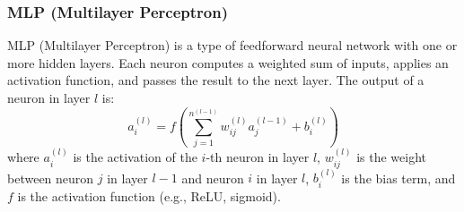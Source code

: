 \subsubsection{MLP (Multilayer Perceptron)}
MLP (Multilayer Perceptron) is a type of feedforward neural network with one or more hidden layers. Each neuron computes a weighted sum of inputs, applies an activation function, and passes the result to the next layer. The output of a neuron in layer $l$ is:
\begin{equation*}
a_i^{(l)} = f \left( \sum_{j=1}^{n^{(l-1)}} w_{ij}^{(l)} a_j^{(l-1)} + b_i^{(l)} \right)
\end{equation*}
where $a_i^{(l)}$ is the activation of the $i$-th neuron in layer $l$, $w_{ij}^{(l)}$ is the weight between neuron $j$ in layer $l-1$ and neuron $i$ in layer $l$, $b_i^{(l)}$ is the bias term, and $f$ is the activation function (e.g., ReLU, sigmoid).





